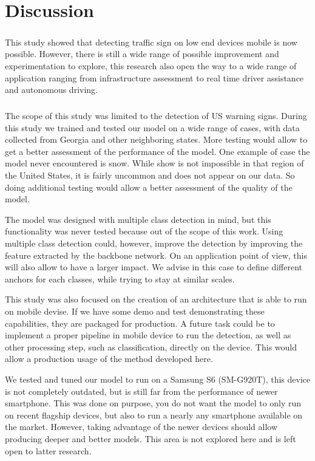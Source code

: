\chapter{Discussion}

\paragraph{}
This study showed that detecting traffic sign on low end devices mobile is now possible. However, there is still a wide range of possible improvement and experimentation to explore, this research also open the way to a wide range of application ranging from infrastructure assessment to real time driver assistance and autonomous driving.

\paragraph{}
The scope of this study was limited to the detection of US warning signs. During this study we trained and tested our model on a wide range of cases, with data collected from Georgia and other neighboring states. More testing would allow to get a better assessment of the performance of the model. One example of case the model never encountered is snow. While show is not impossible in that region of the United States, it is fairly uncommon and does not appear on our data. So doing additional testing would allow a better assessment of the quality of the model.

The model was designed with multiple class detection in mind, but this functionality was never tested because out of the scope of this work. Using multiple class detection could, however, improve the detection by improving the feature extracted by the backbone network. On an application point of view, this will also allow to have a larger impact. We advise in this case to define different anchors for each classes, while trying to stay at similar scales.

This study was also focused on the creation of an architecture that is able to run on mobile devise. If we have some demo and test demonstrating these capabilities, they are packaged for production. A future task could be to implement a proper pipeline in mobile device to run the detection, as well as other processing step, such as classification, directly on the device. This would allow a production usage of the method developed here.

We tested and tuned our model to run on a Samsung S6 (SM-G920T), this device is not completely outdated, but is still far from the performance of newer smartphone. This was done on purpose, you do not want the model to only run on recent flagship devices, but also to run a nearly any smartphone available on the market. However, taking advantage of the newer devices should allow producing deeper and better models. This area is not explored here and is left open to latter research.

